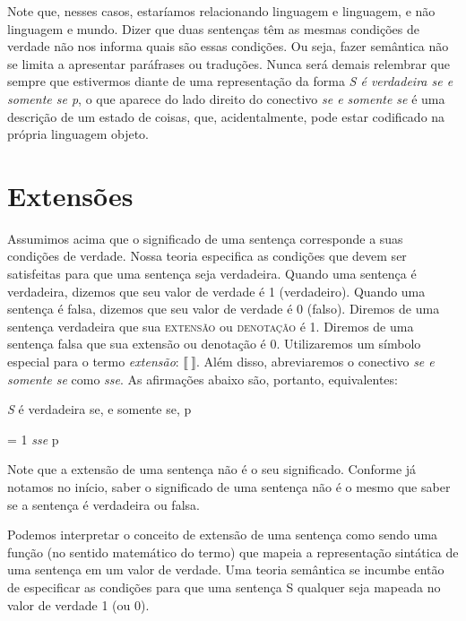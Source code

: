 \n Note que, nesses casos, estaríamos relacionando linguagem e linguagem, e não linguagem e mundo. Dizer que duas sentenças têm as mesmas condições de verdade não nos informa quais são essas condições. Ou seja, fazer semântica não se limita a apresentar paráfrases ou traduções. Nunca será demais relembrar que sempre que estivermos diante de
uma representa\-ção da forma \textit{S é verdadeira se e somente se p}, o que aparece do lado direito do conectivo \textit{se e somente se} é uma descri\-ção de um estado de coisas, que, acidentalmente, pode estar codificado na própria linguagem objeto.

\section{Extensões}

Assumimos acima que o significado de uma sentença corresponde a
suas condi\-çõ\-es de verdade. Nossa teoria especifica as
condi\-çõ\-es que devem ser satisfeitas para que uma sentença seja
verdadeira. Quando uma sentença é verdadeira, dizemos que seu
valor de verdade é 1 (verdadeiro). Quando uma sentença é falsa,
dizemos que seu valor de verdade é 0 (falso). Diremos de uma
sentença verdadeira que sua \textsc{extensão} ou
\textsc{denotação} é 1. Diremos de uma sentença falsa
que sua extensão ou denota\-ção é 0. Utilizaremos um símbolo
especial para o termo \textit{extensão}: $\llbracket \ \rrbracket$. Além
disso, abreviaremos o conectivo \textit{se e somente se} como
\textit{sse}. As afirma\-çõ\-es abaixo são, portanto,
equivalentes:

\begin{exe} 
	\ex \textit{S} é verdadeira se, e somente se, p
\end{exe}

\begin{exe} 
	\ex {} = 1 \textit{sse} p
\end{exe}

\noindent Note que a extensão de uma sentença não é o seu
significado. Conforme já notamos no início, saber o significado de
uma sentença não é o mesmo que saber se a sentença é verdadeira ou
falsa.

Podemos interpretar o conceito de extensão de uma sentença como
sendo uma fun\-ção (no sentido matemático do termo) que mapeia a
representa\-ção sintática de uma sentença em um valor de verdade.
Uma teoria semântica se incumbe então de especificar as
condi\-çõ\-es para que uma sentença S qualquer seja mapeada no
valor de verdade 1 (ou 0).

